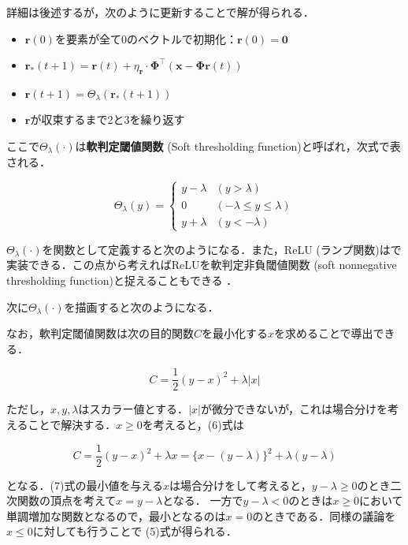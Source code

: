 詳細は後述するが，次のように更新することで解が得られる．

\begin{itemize}
\item $\mathbf{r}(0)$を要素が全て0のベクトルで初期化：$\mathbf{r}(0)=\mathbf{0}$
\item $\mathbf{r}_*(t+1)=\mathbf{r}(t)+\eta_\mathbf{r}\cdot \mathbf{\Phi}^\top(\mathbf{x}-\mathbf{\Phi}\mathbf{r}(t))$
\item $\mathbf{r}(t+1) = \Theta_\lambda(\mathbf{r}_*(t+1))$
\item $\mathbf{r}$が収束するまで2と3を繰り返す
\end{itemize}

ここで$\Theta_\lambda(\cdot)$は\textbf{軟判定閾値関数} (Soft thresholding function)と呼ばれ，次式で表される．


\begin{equation}
\Theta_\lambda(y)= 
\begin{cases} 
y-\lambda & (y>\lambda)\\ 
0 & (-\lambda\leq y\leq\lambda)\\ 
 y+\lambda & (y<-\lambda) 
\end{cases}
\end{equation}


$\Theta_\lambda(\cdot)$を関数として定義すると次のようになる．また，ReLU (ランプ関数)はで実装できる．この点から考えればReLUを軟判定非負閾値関数 (soft nonnegative thresholding function)と捉えることもできる \cite{Papyan2018-yr}．

次に$\Theta_\lambda(\cdot)$を描画すると次のようになる．


なお，軟判定閾値関数は次の目的関数$C$を最小化する$x$を求めることで導出できる．


\begin{equation}
C=\frac{1}{2}(y-x)^2+\lambda |x|
\end{equation}


ただし，$x, y, \lambda$はスカラー値とする．$|x|$が微分できないが，これは場合分けを考えることで解決する．$x\geq 0$を考えると，(6)式は


\begin{equation}
C=\frac{1}{2}(y-x)^2+\lambda x = \{x-(y-\lambda)\}^2+\lambda(y-\lambda)
\end{equation}


となる．(7)式の最小値を与える$x$は場合分けをして考えると，$y-\lambda\geq0$のとき二次関数の頂点を考えて$x=y-\lambda$となる． 一方で$y-\lambda<0$のときは$x\geq0$において単調増加な関数となるので，最小となるのは$x=0$のときである．同様の議論を$x\leq0$に対しても行うことで (5)式が得られる．

